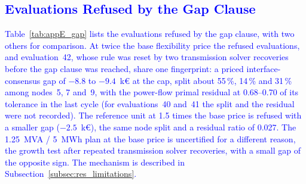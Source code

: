 \subsection{\textcolor{blue}{Evaluations Refused by the Gap Clause}}
\label{app:results_gap}

\textcolor{blue}{
    Table~\ref{tab:appE_gap} lists the evaluations refused by the gap clause, with two others for comparison. At twice the base flexibility price the refused evaluations, and evaluation~42, whose rule was reset by two transmission solver recoveries before the gap clause was reached, share one fingerprint: a priced interface-consensus gap of $-8.8$ to $-9.4$~k\euro{} at the cap, split about 55\,\%, 14\,\% and 31\,\% among nodes~5, 7 and~9, with the power-flow primal residual at 0.68--0.70 of its tolerance in the last cycle (for evaluations~40 and~41 the split and the residual were not recorded). The reference unit at 1.5 times the base price is refused with a smaller gap ($-2.5$~k\euro), the same node split and a residual ratio of 0.027. The 1.25~MVA / 5~MWh plan at the base price is uncertified for a different reason, the growth test after repeated transmission solver recoveries, with a small gap of the opposite sign. The mechanism is described in Subsection~\ref{subsec:res_limitations}.
}

